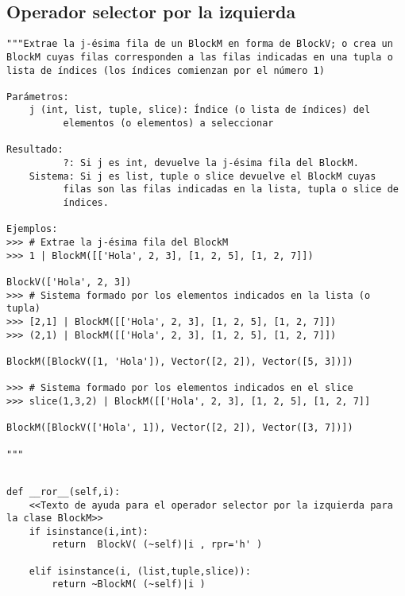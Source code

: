 \documentclass[11pt]{report}
\begin{document}
\subsection{Operador selector por la izquierda}
\label{sec:orga8bb8c3}

\begin{verbatim}
"""Extrae la j-ésima fila de un BlockM en forma de BlockV; o crea un
BlockM cuyas filas corresponden a las filas indicadas en una tupla o
lista de índices (los índices comienzan por el número 1)

Parámetros:
    j (int, list, tuple, slice): Índice (o lista de índices) del 
          elementos (o elementos) a seleccionar

Resultado:
          ?: Si j es int, devuelve la j-ésima fila del BlockM.
    Sistema: Si j es list, tuple o slice devuelve el BlockM cuyas
          filas son las filas indicadas en la lista, tupla o slice de
          índices.

Ejemplos:
>>> # Extrae la j-ésima fila del BlockM 
>>> 1 | BlockM([['Hola', 2, 3], [1, 2, 5], [1, 2, 7]])

BlockV(['Hola', 2, 3])
>>> # Sistema formado por los elementos indicados en la lista (o tupla)
>>> [2,1] | BlockM([['Hola', 2, 3], [1, 2, 5], [1, 2, 7]])
>>> (2,1) | BlockM([['Hola', 2, 3], [1, 2, 5], [1, 2, 7]])

BlockM([BlockV([1, 'Hola']), Vector([2, 2]), Vector([5, 3])])

>>> # Sistema formado por los elementos indicados en el slice
>>> slice(1,3,2) | BlockM([['Hola', 2, 3], [1, 2, 5], [1, 2, 7]]

BlockM([BlockV(['Hola', 1]), Vector([2, 2]), Vector([3, 7])])

"""
\end{verbatim}

\begin{verbatim}

def __ror__(self,i):
    <<Texto de ayuda para el operador selector por la izquierda para la clase BlockM>>
    if isinstance(i,int):
        return  BlockV( (~self)|i , rpr='h' )

    elif isinstance(i, (list,tuple,slice)):        
        return ~BlockM( (~self)|i ) 
        
\end{verbatim}
\end{document}
